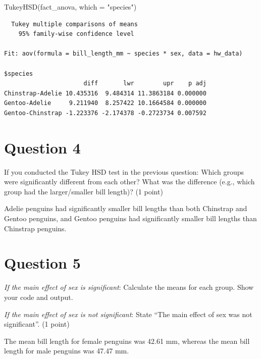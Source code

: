 \documentclass[
  letterpaper,
  DIV=11,
  numbers=noendperiod]{scrartcl}
\newenvironment{Shaded}{\begin{snugshade}}{\end{snugshade}}
\newcommand{\AttributeTok}[1]{\textcolor[rgb]{0.40,0.45,0.13}{#1}}
\newcommand{\FunctionTok}[1]{\textcolor[rgb]{0.28,0.35,0.67}{#1}}
\newcommand{\NormalTok}[1]{\textcolor[rgb]{0.00,0.23,0.31}{#1}}
\newcommand{\SpecialCharTok}[1]{\textcolor[rgb]{0.37,0.37,0.37}{#1}}
\newcommand{\StringTok}[1]{\textcolor[rgb]{0.13,0.47,0.30}{#1}}
\begin{document}
\begin{Shaded}
\begin{Highlighting}[]
\FunctionTok{TukeyHSD}\NormalTok{(fact\_anova, }\AttributeTok{which =} \StringTok{"species"}\NormalTok{)}
\end{Highlighting}
\end{Shaded}

\begin{verbatim}
  Tukey multiple comparisons of means
    95% family-wise confidence level

Fit: aov(formula = bill_length_mm ~ species * sex, data = hw_data)

$species
                      diff       lwr        upr    p adj
Chinstrap-Adelie 10.435316  9.484314 11.3863184 0.000000
Gentoo-Adelie     9.211940  8.257422 10.1664584 0.000000
Gentoo-Chinstrap -1.223376 -2.174378 -0.2723734 0.007592
\end{verbatim}

\section{Question 4}\label{question-4}

If you conducted the Tukey HSD test in the previous question: Which
groups were significantly different from each other? What was the
difference (e.g., which group had the larger/smaller bill length)? (1
point)

\textcolor[RGB]{178,34,34}{Adelie penguins had significantly smaller
bill lengths than both Chinstrap and Gentoo penguins, and Gentoo
penguins had significantly smaller bill lengths than Chinstrap
penguins.}

\section{Question 5}\label{question-5}

\emph{If the main effect of sex is significant}: Calculate the means for
each group. Show your code and output.

\emph{If the main effect of sex is not significant}: State ``The main
effect of sex was not significant''. (1 point)

\textcolor[RGB]{178,34,34}{The mean bill length for female penguins was
42.61 mm, whereas the mean bill length for male penguins was 47.47 mm.}

\begin{Shaded}
\end{Shaded}
\end{document}
